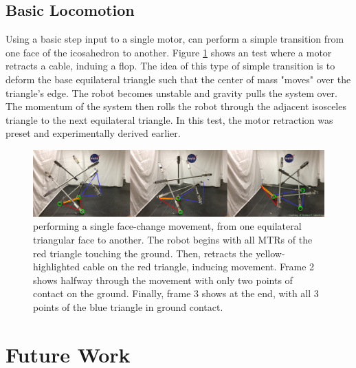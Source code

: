 \subsection{Basic Locomotion}
\label{basic_locomotion}
Using a basic step input to a single motor, \SB{} can perform a simple transition from one face of the icosahedron to another.
Figure \ref{fig:superball_flop_flat} shows an test where a motor retracts a cable, induing a flop.
The idea of this type of simple transition is to deform the base equilateral triangle such that the center of mass "moves" over the triangle's edge.
The robot becomes unstable and gravity pulls the system over.
The momentum of the system then rolls the robot through the adjacent isosceles triangle to the next equilateral triangle.
In this test, the motor retraction was preset and experimentally derived earlier.

\begin{figure}[t]
    \centering
    \includegraphics[width=1\linewidth]{tex/img/superball_flop_combined_betterlabels}
    \caption{\SB{} performing a single face-change movement, from one equilateral triangular face to another. The robot begins with all MTRs of the red triangle touching the ground. Then, \SB{} retracts the yellow-highlighted cable on the red triangle, inducing movement. Frame 2 shows \SB{} halfway through the movement with only two points of contact on the ground. Finally, frame 3 shows \SB{} at the end, with all 3 points of the blue triangle in ground contact.}
    \label{fig:superball_flop_flat}
\end{figure}

\section{Future Work}



